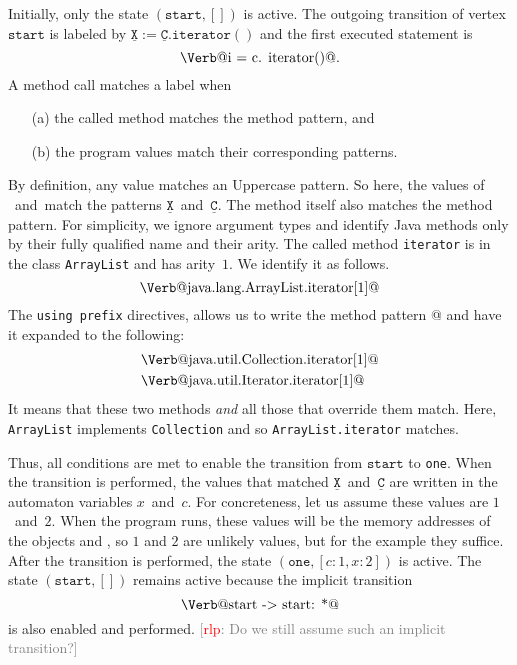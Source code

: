 \documentclass[10pt, preprint]{sigplanconf} %
\makeatletter
\newcommand{\noterg}[2]{\textcolor{gray}{[\textcolor{red}{#1}: #2]}}
\newcommand{\rlp}[1]{\noterg{rlp}{#1}}
\newcommand{\pattern}[1]{\ensuremath{\mathtt{\underline{#1}}}}
\newcommand{\start}{\ensuremath{\mathtt{start}}\xspace}
\newcommand{\verbline}[2][]{\[\text{\Verb@#2@}#1\]}
\makeatother
\begin{document}
Initially, only the state $(\start,[])$ is active.
The outgoing transition of vertex \start is labeled by $\pattern X:=\pattern{C}.\mathtt{iterator}()$ and the first executed statement is \verbline[.]{i = c.\PY{n+na}{iterator}()}
A method call matches a label when
\begin{itemize}
\item[(a)] the called method matches the method pattern, and
\item[(b)] the program values match their corresponding patterns.
\end{itemize}
By definition, any value matches an Uppercase pattern.
So here, the values of \Verb@i@~and~\Verb@c@ match the patterns \pattern X~and~\pattern C.
The method itself also matches the method pattern.
For simplicity, we ignore argument types and identify Java methods only by their fully qualified name and their arity.
The called method \texttt{iterator} is in the class \texttt{ArrayList} and has arity~$1$.
We identify it as follows.
\verbline{java.lang.ArrayList.iterator[1]}
The \texttt{using prefix} directives, allows us to write the method pattern \Verb@iterator[1]@
and have it expanded to the following:
\begin{align*}
&\text{\Verb@java.util.Collection.iterator[1]@} \\
&\text{\Verb@java.util.Iterator.iterator[1]@}
\end{align*}
It means that these two methods \emph{and} all those that override them match.
Here, \texttt{ArrayList} implements \texttt{Collection} and so
\texttt{ArrayList.iterator} matches.

Thus, all conditions are met to enable the transition from \start to \texttt{one}.
When the transition is performed, the values that matched \pattern X~and~\pattern C are written in the automaton variables $x$~and~$c$.
For concreteness, let us assume these values are $1$~and~$2$. When the
program runs, these values will be the memory addresses of the objects
\Verb@c@ and \Verb@i@, so $1$ and $2$ are unlikely values, but for the
example they suffice.
After the transition is performed, the state $(\mathtt{one},[c:1,x:2])$ is active.
The state $(\start,[])$ remains active because the implicit transition \verbline{start -> start: *} is also enabled and performed.
\rlp{Do we still assume such an implicit transition?}
\end{document}
